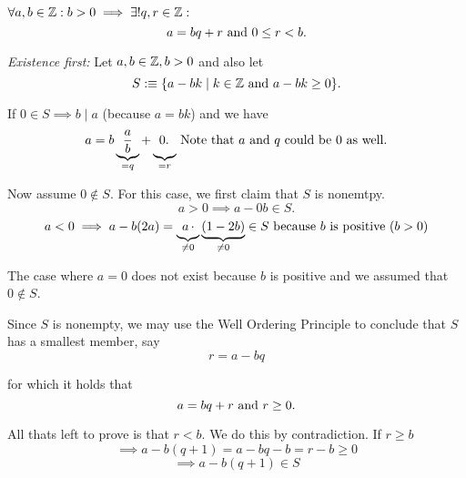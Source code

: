 \begin{thm}
  \label{thm: Divison Algorithm}
  $\forall a,b \in \mathbb{Z}: b > 0 \implies \exists ! q,r \in \mathbb{Z}: $
  \begin{equation}
    a = bq + r $ and $ 0 \leq r < b.
  \end{equation}
\end{thm}
\begin{prf}
  \emph{Existence first:} Let $a,b \in \mathbb{Z}, b > 0$ and also let
  \begin{equation}
    S :\equiv \{ a- bk \mid k \in \integer $ and $ a-bk \geq 0 \}.
  \end{equation}

  If $0 \in S \implies b \mid a $ (because $a=bk$) and we have
  \begin{equation}
    a = b \underbrace{\frac{a}{b}}_{= q} + \underbrace{0.\phantom{\frac{a}{b}\!\!\!\!}}_{= r}
    $ Note that $a$ and $q$ could be $0$ as well$.
  \end{equation}

  Now assume $0 \notin S$. For this case, we first claim that $S$ is nonemtpy.
  \begin{equation}
    a>0 \implies a-0b \in S.
  \end{equation}
  \begin{equation}
    a<0 \implies a-b(2a) = \underbrace{\!\!\phantom{(}a\,\cdot}_{\neq 0} \underbrace{(1-2b)}_{\neq 0} \in S $ because $b$ is positive $ (b>0)
  \end{equation}

  The case where $a=0$ does not exist because $b$ is positive and we assumed that $0 \notin S$.

  Since $S$ is nonempty, we may use the Well Ordering Principle to conclude that $S$ has a smallest member, say
  \begin{equation}
    r = a -bq
  \end{equation}

  for which it holds that
  \begin{equation}
    a=bq+r $ and $ r \geq 0.
  \end{equation}

  All thats left to prove is that $r  < b$. We do this by contradiction. If $r \geq b$
  \begin{equation}
    \implies a-b(q+1) = a-bq -b = r-b \geq 0
  \end{equation}
  \begin{equation}
    \implies a-b(q+1) \in S
  \end{equation}


\end{prf}
